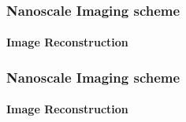 \documentclass[mathserif,16pt,xcolor=table]{beamer}
\begin{document}
  \begin{frame}[t]
    \frametitle{Nanoscale Imaging scheme}
    \framesubtitle{Image Reconstruction}
    \begin{center}
      \begin{figure}[t!]
        \centering \vspace*{-.5cm}
        \def\svgwidth{.55\linewidth}
        
        \label{fig:sim}
      \end{figure}
    \end{center}
  \end{frame}
  \begin{frame}[t]
    \frametitle{Nanoscale Imaging scheme}
    \framesubtitle{Image Reconstruction}
    \begin{center}
      \begin{figure}[t!]
        \centering
        \vspace*{-1cm}
        \label{fig:simulation1}
      \end{figure}
    \end{center}
  \end{frame}
\end{document}
